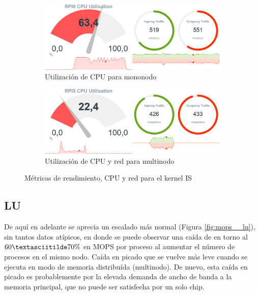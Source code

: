 \begin{figure}[h!]
    \begin{subfigure}[c]{0.75\textwidth}
        \includegraphics[width=\textwidth]{img/benchmark_rev/is_rev_sn.png}
        \caption{Utilización de CPU para mononodo}
        \label{fig:mops_rev_sn__is}
    \end{subfigure}

    \vspace{0.5cm}
    
    \begin{subfigure}[c]{0.75\textwidth}
        \includegraphics[width=\textwidth]{img/benchmark_rev/is_rev_mn.png}
        \caption{Utilización de CPU y red para multinodo}
        \label{fig:mops_rev_mn__is}
    \end{subfigure}
    \caption{Métricas de rendimiento, CPU y red para el kernel IS}
    \label{fig:mops__is}
\end{figure}

\subsection{LU}
\label{ssec:comparacion_resultados__lu}
De aquí en adelante se aprecia un escalado más normal (Figura \ref{fig:mops__lu}), sin tantos datos atípicos, en donde se puede observar una caída de en torno al $60\textasciitilde70\%$ en MOPS por proceso al aumentar el número de procesos en el mismo nodo. Caída en picado que se vuelve más leve cuando se ejecuta en modo de memoria distribuída (multinodo). De nuevo, esta caída en picado es probablemente por la elevada demanda de ancho de banda a la memoria principal, que no puede ser satisfecha por un solo chip.

